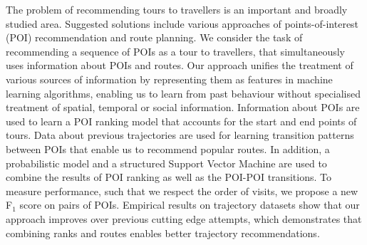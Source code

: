 The problem of recommending tours to travellers is an important and broadly studied area.
Suggested solutions include various approaches of points-of-interest (POI) 
recommendation and route planning.
We consider the task of recommending a sequence of POIs as a tour
to travellers, that simultaneously uses information about POIs and routes.
Our approach unifies the treatment of various sources of information
by representing them as features in machine learning algorithms, enabling us to
learn from past behaviour without specialised treatment of
spatial, temporal or social information.
Information about POIs are used to learn a POI ranking model
that accounts for the start and end points of tours.
Data about previous trajectories are used for learning transition patterns between POIs that
enable us to recommend popular routes.
In addition, a probabilistic model and a structured Support Vector Machine are used
to combine the results of POI ranking as well as the POI-POI transitions.
To measure performance, such that we respect the order of visits, we propose
a new F$_1$ score on pairs of POIs.
Empirical results on trajectory datasets show that our approach improves over 
previous cutting edge attempts, which demonstrates that
combining ranks and routes enables better trajectory recommendations.
